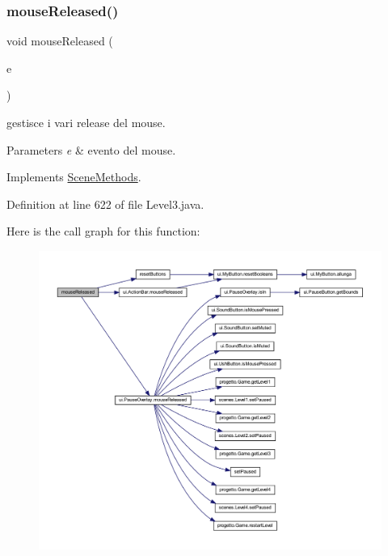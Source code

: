 \subsubsection{\texorpdfstring{mouse\+Released()}{mouseReleased()}}
{\footnotesize\ttfamily void mouse\+Released (\begin{DoxyParamCaption}\item[{Mouse\+Event}]{e }\end{DoxyParamCaption})}



gestisce i vari release del mouse. 


\begin{DoxyParams}{Parameters}
{\em e} & evento del mouse. \\
\hline
\end{DoxyParams}


Implements \hyperlink{interfacescenes_1_1_scene_methods_a87a07291794e15052db67f945d90853e}{Scene\+Methods}.



Definition at line 622 of file Level3.\+java.

Here is the call graph for this function\+:\nopagebreak
\begin{figure}[H]
\begin{center}
\leavevmode
\includegraphics[width=350pt]{classscenes_1_1_level3_a87a07291794e15052db67f945d90853e_cgraph}
\end{center}
\end{figure}
\mbox{\label{classscenes_1_1_level3_addba85b44e35a186e066b2e801f433c4}} 
